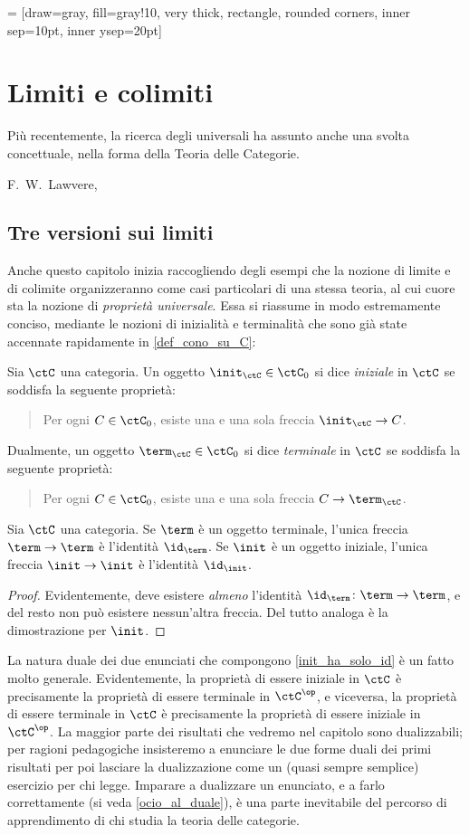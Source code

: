  = [draw=gray, fill=gray!10, very thick,
rectangle, rounded corners, inner sep=10pt, inner ysep=20pt]
\chapter{Limiti e colimiti}\label{chap_limiti_colimiti}
\epigraph{Più recentemente, la ricerca degli universali ha assunto anche una svolta concettuale, nella forma della Teoria delle Categorie.}{F.\ W.\ Lawvere, \cite{lawvere1969adjointness}}
\section{Tre versioni sui limiti}
Anche questo capitolo inizia raccogliendo degli esempi che la nozione di limite e di colimite organizzeranno come casi particolari di una stessa teoria, al cui cuore sta la nozione di \emph{proprietà universale}. Essa si riassume in modo estremamente conciso, mediante le nozioni di inizialità e terminalità che sono già state accennate rapidamente in \ref{def_cono_su_C}:
\begin{definition}
	Sia \(\ctC\) una categoria. Un oggetto \(\init_\ctC\in\ctC_0\) si dice \emph{iniziale} in \(\ctC\) se soddisfa la seguente proprietà:
	\begin{quote}
		Per ogni \(C\in\ctC_0\), esiste una e una sola freccia \(\init_\ctC \to C\).
	\end{quote}
	Dualmente, un oggetto \(\term_\ctC\in\ctC_0\) si dice \emph{terminale} in \(\ctC\) se soddisfa la seguente proprietà:
	\begin{quote}
		Per ogni \(C\in\ctC_0\), esiste una e una sola freccia \(C\to\term_\ctC\).
	\end{quote}
\end{definition}
\begin{lemma}\label{init_ha_solo_id}
	Sia \(\ctC\) una categoria. Se \(\term\) è un oggetto terminale, l'unica freccia \(\term\to\term\) è l'identità \(\id_{\term}\). Se \(\init\) è un oggetto iniziale, l'unica freccia \(\init\to\init\) è l'identità \(\id_{\init}\).
\end{lemma}
\begin{proof}
	Evidentemente, deve esistere \emph{almeno} l'identità \(\id_{\term} \colon \term\to\term\), e del resto non può esistere nessun'altra freccia. Del tutto analoga è la dimostrazione per \(\init\).
\end{proof}
La natura duale dei due enunciati che compongono \ref{init_ha_solo_id} è un fatto molto generale. Evidentemente, la proprietà di essere iniziale in \(\ctC\) è precisamente la proprietà di essere terminale in \(\ctC^\op\), e viceversa, la proprietà di essere terminale in \(\ctC\) è precisamente la proprietà di essere iniziale in \(\ctC^\op\). La maggior parte dei risultati che vedremo nel capitolo sono dualizzabili; per ragioni pedagogiche insisteremo a enunciare le due forme duali dei primi risultati per poi lasciare la dualizzazione come un (quasi sempre semplice) esercizio per chi legge. Imparare a dualizzare un enunciato, e a farlo correttamente (si veda \ref{ocio_al_duale}), è una parte inevitabile del percorso di apprendimento di chi studia la teoria delle categorie.
